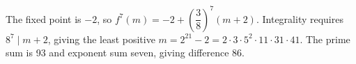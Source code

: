 The fixed point is $-2$, so $f^7(m)=-2+(\dfrac{3}{8})^7(m+2)$. Integrality requires $8^7\mid m+2$, giving the least positive $m=2^{21}-2=2\cdot3\cdot5^2\cdot11\cdot31\cdot41$. The prime sum is 93 and exponent sum seven, giving difference $\boxed{86}$.
